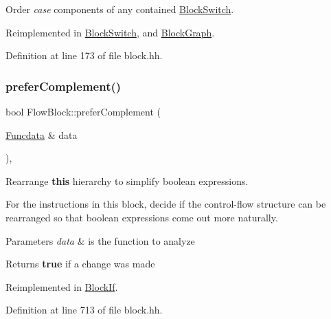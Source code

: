 Order {\itshape case} components of any contained \mbox{\hyperlink{class_block_switch}{Block\+Switch}}. 



Reimplemented in \mbox{\hyperlink{class_block_switch_a3413057234f7606357b6037a516627a6}{Block\+Switch}}, and \mbox{\hyperlink{class_block_graph_aaab258bf71213db644bb8e1764f81b1f}{Block\+Graph}}.



Definition at line 173 of file block.\+hh.

\mbox{\label{class_flow_block_a6ab46f9a87bc94b30bd3bee0923b3f51}} 
\subsubsection{\texorpdfstring{preferComplement()}{preferComplement()}}
{\footnotesize\ttfamily bool Flow\+Block\+::prefer\+Complement (\begin{DoxyParamCaption}\item[{\mbox{\hyperlink{class_funcdata}{Funcdata}} \&}]{data }\end{DoxyParamCaption})\hspace{0.3cm}{\ttfamily [inline]}, {\ttfamily [virtual]}}



Rearrange {\bfseries{this}} hierarchy to simplify boolean expressions. 

For the instructions in this block, decide if the control-\/flow structure can be rearranged so that boolean expressions come out more naturally. 
\begin{DoxyParams}{Parameters}
{\em data} & is the function to analyze \\
\hline
\end{DoxyParams}
\begin{DoxyReturn}{Returns}
{\bfseries{true}} if a change was made 
\end{DoxyReturn}


Reimplemented in \mbox{\hyperlink{class_block_if_a41fef7fb5278f859257b6e560c0a08dd}{Block\+If}}.



Definition at line 713 of file block.\+hh.


